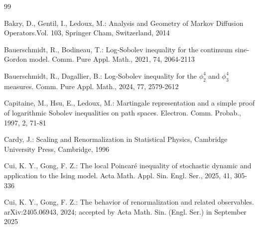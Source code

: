 \documentclass[11pt]{article}
\numberwithin{equation}{section}%
\numberwithin{figure}{section}%
\theoremstyle{remark}
\begin{document}
	
	\begin{thebibliography}{99}
		
		
		
		
		
		
		
		 Bakry, D., Gentil, I., Ledoux, M.: Analysis and Geometry of Markov Diffusion Operators.Vol. 103, Springer Cham, Switzerland, 2014
		
		
		Bauerschmidt, R., Bodineau, T.: Log‐Sobolev inequality for the continuum sine‐Gordon model. Comm. Pure Appl. Math., 2021, 74, 2064-2113
		
		
		Bauerschmidt, R., Dagallier, B.: Log‐Sobolev inequality for the $\phi_{2}^{4}$ and $\phi_{3}^{4}$ measures. Comm. Pure Appl. Math., 2024, 77, 2579-2612
		
		
		
    	Capitaine, M., Hsu, E., Ledoux, M.: Martingale representation and a simple proof of logarithmic Sobolev inequalities on path spaces. Electron. Comm. Probab., 1997, 2, 71-81
	
		Cardy, J.: Scaling and Renormalization in Statistical Physics, Cambridge University Press, Cambridge, 1996
		
		
		 Cui, K. Y., Gong, F. Z.: The local Poincar\'e inequality of stochastic dynamic and application to the Ising model. Acta Math. Appl. Sin. Engl. Ser., 2025, 41, 305-336
		
		
		 Cui, K. Y., Gong, F. Z.: The behavior of renormalization and related observables. arXiv:2405.06943, 2024; accepted by Acta Math. Sin. (Engl. Ser.) in September 2025 
		


\end{thebibliography}
\end{document}
